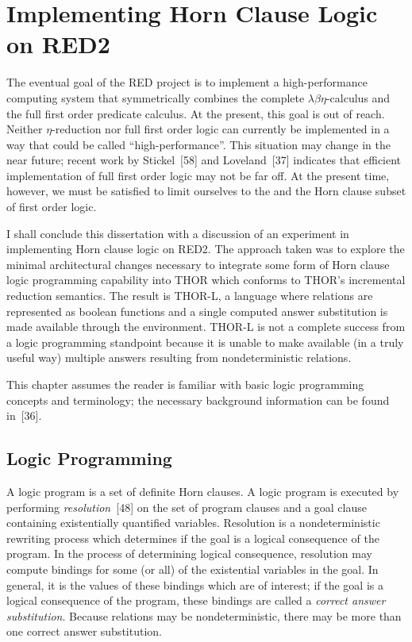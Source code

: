 \chapter{Implementing Horn Clause Logic on RED2}

The eventual goal of the RED project is to implement a high-performance
computing system that symmetrically combines the complete
\(\lambda\beta\eta\)-calculus and the full first order predicate calculus. At
the present, this goal is out of reach. Neither \(\eta\)-reduction nor full
first order logic can currently be implemented in a way that could be called
``high-performance''. This situation may change in the near future; recent work
by Stickel~[58] and Loveland~[37] indicates that efficient implementation of
full first order logic may not be far off. At the present time, however, we
must be satisfied to limit ourselves to the \lambdabetacalculus{} and the Horn
clause subset of first order logic.

I shall conclude this dissertation with a discussion of an experiment in
implementing Horn clause logic on RED2. The approach taken was to explore the
minimal architectural changes necessary to integrate some form of Horn clause
logic programming capability into THOR which conforms to THOR's incremental
reduction semantics. The result is THOR-L, a language where relations are
represented as boolean functions and a single computed answer substitution is
made available through the environment. THOR-L is not a complete success from a
logic programming standpoint because it is unable to make available (in a truly
useful way) multiple answers resulting from nondeterministic relations.

This chapter assumes the reader is familiar with basic logic programming
concepts and terminology; the necessary background information can be found
in~[36].

\section{Logic Programming}

A logic program is a set of definite Horn clauses. A logic program is executed
by performing \emph{resolution}~[48] on the set of program clauses and a goal clause
containing existentially quantified variables. Resolution is a nondeterministic
rewriting process which determines if the goal is a logical consequence of the
program. In the process of determining logical consequence, resolution may
compute bindings for some (or all) of the existential variables in the goal. In
general, it is the values of these bindings which are of interest; if the goal
is a logical consequence of the program, these bindings are called a \emph{correct
answer substitution}. Because relations may be nondeterministic, there may be
more than one correct answer substitution.

